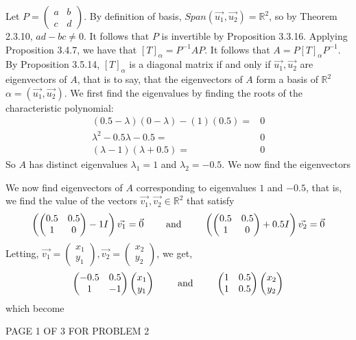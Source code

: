 \documentclass[12pt]{article}
\newenvironment{problem}[2][Problem]
{
	\begin{trivlist} 
		\item[\hskip \labelsep {\bfseries #1 #2:}]
	}
{
	\end{trivlist}
	}
\newenvironment{solution}[1][Solution]
{
	\begin{trivlist} 
		\item[\hskip \labelsep {\itshape #1:}]
	}
	{
	\end{trivlist}
}
\begin{document}
\begin{problem}{2}
\begin{solution}
Let $P=\begin{pmatrix}a&b\\c&d\end{pmatrix}$. By definition of basis, $Span(\vec{u_{1}},\vec{u_{2}})=\mathbb{R}^2$, so by Theorem 2.3.10, $ad-bc\neq 0$. It follows that $P$ is invertible by Proposition 3.3.16. Applying Proposition 3.4.7, we have that $[T]_{\alpha} = P^{-1} A P$. It follows that $A=P [T]_{\alpha} P^{-1}$. By Proposition 3.5.14, $[T]_{\alpha}$ is a diagonal matrix if and only if $\vec{u_{1}},\vec{u_{2}}$ are eigenvectors of $A$, that is to say, that the eigenvectors of $A$ form a basis of $\mathbb{R}^2$ $\alpha=(\vec{u_{1}},\vec{u_{2}})$.
We first find the eigenvalues by finding the roots of the characteristic polynomial:
\begin{align*}
(0.5-\lambda)(0-\lambda) - (1)(0.5) =& 0\\
{\lambda}^2 - 0.5 \lambda - 0.5 =& 0\\
(\lambda - 1)(\lambda+0.5)=&0
\end{align*}
So $A$ has distinct eigenvalues $\lambda_{1}=1$ and $\lambda_{2}=-0.5$. We now find the eigenvectors


We now find eigenvectors of $A$ corresponding to eigenvalues $1$ and $-0.5$, that is, we find the value of the vectors $\vec{v_{1}}, \vec{v_{2}} \in \mathbb{R}^2$ that satisfy
\[
\left( \begin{pmatrix}0.5&0.5\\1&0\end{pmatrix} - 1I \right) \vec{v_{1}} = \vec{0}
 \hphantom{1000}
 \text{ and }
 \hphantom{1000}
\left( \begin{pmatrix}0.5&0.5\\1&0\end{pmatrix} +0.5I \right) \vec{v_{2}} = \vec{0}
\]
Letting, $\vec{v_{1}}=\begin{pmatrix} x_{1}\\y_{1}\end{pmatrix},\vec{v_{2}} = \begin{pmatrix} x_{2}\\y_{2}\end{pmatrix}$, we get,
\[
\begin{pmatrix}-0.5&0.5\\1&-1\end{pmatrix} \begin{pmatrix} x_{1}\\y_{1}\end{pmatrix} %
 \hphantom{1000}
 \text{ and }
 \hphantom{1000}
\begin{pmatrix}1&0.5\\1&0.5\end{pmatrix}\begin{pmatrix} x_{2}\\y_{2}\end{pmatrix} %
\]
which become
\end{solution}
\vfill
\centerline{PAGE 1 OF 3 FOR PROBLEM 2}
\end{problem}
\end{document}
